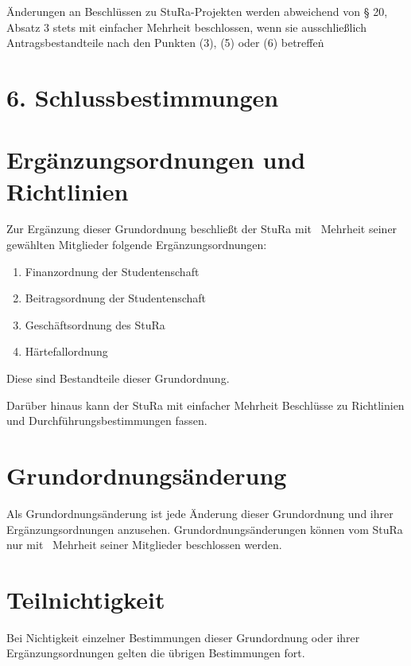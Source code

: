 \begin{multicols}{2}
\Abs \Satz Änderungen an Beschlüssen zu StuRa-Projekten werden abweichend von § 20, Absatz 3 stets mit einfacher Mehrheit beschlossen, wenn sie ausschließlich Antragsbestandteile nach den Punkten (3), (5) oder (6) betreffen\.


\setcounter{section}{28}


\section*{6. Schlussbestimmungen}



\section{Ergänzungsordnungen und Richtlinien}

\Abs \Satz Zur Ergänzung dieser Grundordnung beschließt der StuRa mit ~Mehrheit seiner gewählten Mitglieder folgende Ergänzungsordnungen:
\begin{enumerate}
\item Finanzordnung der Studentenschaft
\item Beitragsordnung der Studentenschaft
\item Geschäftsordnung des StuRa
\item Härtefallordnung
\end{enumerate}

\Abs \Satz Diese sind Bestandteile dieser Grundordnung.

\Abs \Satz Darüber hinaus kann der StuRa mit einfacher Mehrheit Beschlüsse zu Richtlinien und Durchführungsbestimmungen fassen.



\section{Grundordnungsänderung}

\Abs \Satz Als Grundordnungsänderung ist jede Änderung dieser Grundordnung und ihrer Ergänzungsordnungen anzusehen. Grundordnungsänderungen können vom StuRa nur mit ~Mehrheit seiner Mitglieder beschlossen werden.



\section{Teilnichtigkeit}

\Abs \Satz Bei Nichtigkeit einzelner Bestimmungen dieser Grundordnung oder ihrer Ergänzungsordnungen gelten die übrigen Bestimmungen fort.




\end{multicols}
